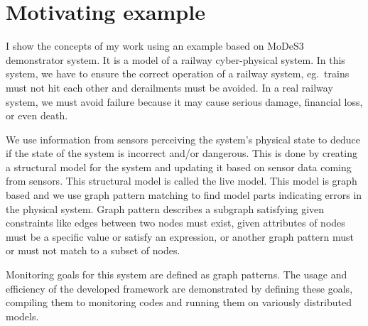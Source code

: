 \chapter{Motivating example}


I show the concepts of my work using an example based on MoDeS3~\cite{modes3} demonstrator system. It is a model of a railway cyber-physical system. In this system, we have to ensure the correct operation of a railway system, eg.\ trains must not hit each other and derailments must be avoided. In a real railway system, we must avoid failure because it may cause serious damage, financial loss, or even death.

We use information from sensors perceiving the system's physical state to deduce if the state of the system is incorrect and/or dangerous. This is done by creating a structural model for the system and updating it based on sensor data coming from sensors. This structural model is called the live model. This model is graph based and we use graph pattern matching to find model parts indicating errors in the physical system. Graph pattern describes a subgraph satisfying given constraints like edges between two nodes must exist, given attributes of nodes must be a specific value or satisfy an expression, or another graph pattern must or must not match to a subset of nodes.

Monitoring goals for this system are defined as graph patterns. The usage and efficiency of the developed framework are demonstrated by defining these goals, compiling them to monitoring codes and running them on variously distributed models.

 




